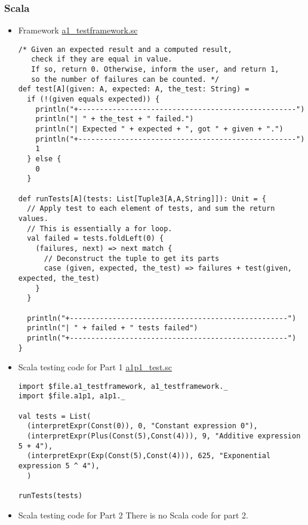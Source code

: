 \documentclass[11pt]{article}
\begin{document}
\subsubsection*{Scala}
\label{sec:org3a3996b}
\begin{itemize}
\item Framework
\label{sec:orgb59d6a8}
\href{./testing/a1/a1\_testframework.sc}{a1\_testframework.sc}
\begin{verbatim}
/* Given an expected result and a computed result,
   check if they are equal in value.
   If so, return 0. Otherwise, inform the user, and return 1,
   so the number of failures can be counted. */
def test[A](given: A, expected: A, the_test: String) =
  if (!(given equals expected)) {
    println("+---------------------------------------------------")
    println("| " + the_test + " failed.")
    println("| Expected " + expected + ", got " + given + ".")
    println("+---------------------------------------------------")
    1
  } else {
    0
  }

def runTests[A](tests: List[Tuple3[A,A,String]]): Unit = {
  // Apply test to each element of tests, and sum the return values.
  // This is essentially a for loop.
  val failed = tests.foldLeft(0) {
    (failures, next) => next match {
      // Deconstruct the tuple to get its parts
      case (given, expected, the_test) => failures + test(given, expected, the_test)
    }
  }
  
  println("+---------------------------------------------------")
  println("| " + failed + " tests failed")
  println("+---------------------------------------------------")
}
\end{verbatim}

\item Scala testing code for Part 1
\label{sec:org4833352}
\href{./testing/a1/a1p1\_test.sc}{a1p1\_test.sc}
\begin{verbatim}
import $file.a1_testframework, a1_testframework._
import $file.a1p1, a1p1._

val tests = List(
  (interpretExpr(Const(0)), 0, "Constant expression 0"),
  (interpretExpr(Plus(Const(5),Const(4))), 9, "Additive expression 5 + 4"),
  (interpretExpr(Exp(Const(5),Const(4))), 625, "Exponential expression 5 ^ 4"),
  )

runTests(tests)
\end{verbatim}

\item Scala testing code for Part 2
\label{sec:org5cb81df}
There is no Scala code for part 2.


\end{itemize}
\end{document}
